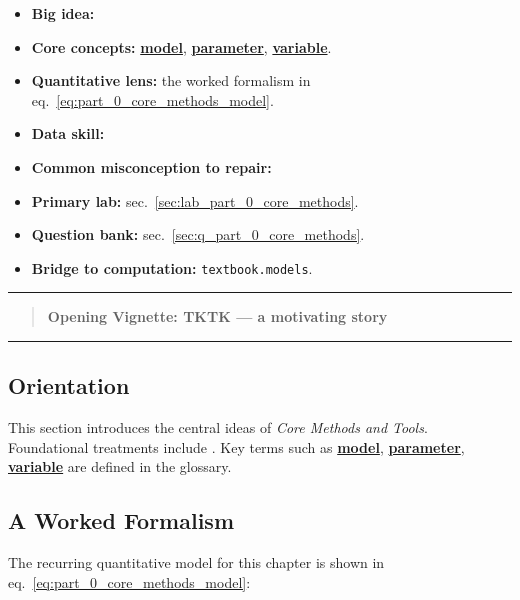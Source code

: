 \documentclass[
]{article}
\providecommand{\tightlist}{%
  \setlength{\itemsep}{0pt}\setlength{\parskip}{0pt}}
\theoremstyle{plain}
\theoremstyle{definition}
\begin{document}
\begin{itemize}
\tightlist
\item
  \textbf{Big idea:}
\item
  \textbf{Core concepts:} \hyperref[gl:model]{\textbf{model}},
  \hyperref[gl:parameter]{\textbf{parameter}},
  \hyperref[gl:variable]{\textbf{variable}}.
\item
  \textbf{Quantitative lens:} the worked formalism in
  eq.~\ref{eq:part_0_core_methods_model}.
\item
  \textbf{Data skill:}
\item
  \textbf{Common misconception to repair:}
\item
  \textbf{Primary lab:} sec.~\ref{sec:lab_part_0_core_methods}.
\item
  \textbf{Question bank:} sec.~\ref{sec:q_part_0_core_methods}.
\item
  \textbf{Bridge to computation:} \texttt{textbook.models}.
\end{itemize}

\begin{center}\rule{0.5\linewidth}{0.5pt}\end{center}

\begin{quote}
\textbf{Opening Vignette: TKTK --- a motivating story}
\end{quote}

\begin{center}\rule{0.5\linewidth}{0.5pt}\end{center}

\subsection{Orientation}\label{orientation-1}

This section introduces the central ideas of \emph{Core Methods and
Tools}. Foundational treatments include
\citep{kim2020data, brown2017principles}. Key terms such as
\hyperref[gl:model]{\textbf{model}},
\hyperref[gl:parameter]{\textbf{parameter}},
\hyperref[gl:variable]{\textbf{variable}} are defined in the glossary.

\subsection{A Worked Formalism}\label{a-worked-formalism-1}

The recurring quantitative model for this chapter is shown in
eq.~\ref{eq:part_0_core_methods_model}:
\end{document}
